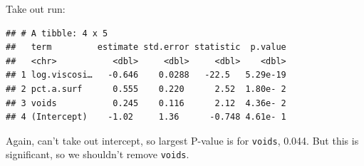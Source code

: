 \documentclass[
  ignorenonframetext,
]{beamer}
\newenvironment{Shaded}{\begin{snugshade}}{\end{snugshade}}
\newcommand{\FloatTok}[1]{\textcolor[rgb]{0.00,0.00,0.81}{#1}}
\newcommand{\KeywordTok}[1]{\textcolor[rgb]{0.13,0.29,0.53}{\textbf{#1}}}
\newcommand{\NormalTok}[1]{#1}
\newcommand{\OperatorTok}[1]{\textcolor[rgb]{0.81,0.36,0.00}{\textbf{#1}}}
\newcommand{\StringTok}[1]{\textcolor[rgb]{0.31,0.60,0.02}{#1}}
\begin{document}
\begin{frame}[fragile]{Take out run:}
\protect\hypertarget{take-out-run}{}

\begin{Shaded}
\end{Shaded}

\begin{verbatim}
## # A tibble: 4 x 5
##   term         estimate std.error statistic  p.value
##   <chr>           <dbl>     <dbl>     <dbl>    <dbl>
## 1 log.viscosi…   -0.646    0.0288   -22.5   5.29e-19
## 2 pct.a.surf      0.555    0.220      2.52  1.80e- 2
## 3 voids           0.245    0.116      2.12  4.36e- 2
## 4 (Intercept)    -1.02     1.36      -0.748 4.61e- 1
\end{verbatim}

Again, can't take out intercept, so largest P-value is for
\texttt{voids}, 0.044. But this is significant, so we shouldn't remove
\texttt{voids}.

\end{frame}
\end{document}
